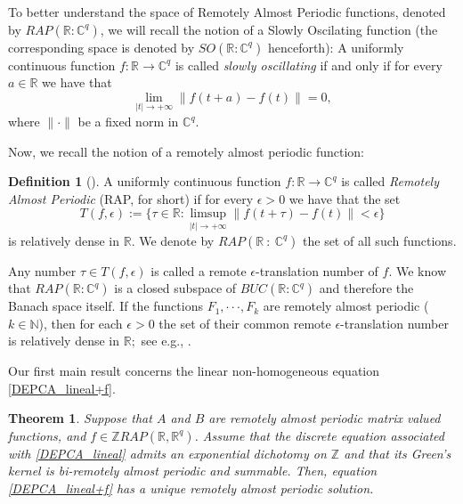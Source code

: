 \documentclass[english,,reqno]{amsart}
\numberwithin{equation}{section}
\theoremstyle{plain}
\newtheorem{thm}{Theorem}[section]
\theoremstyle{definition}
\newtheorem{defn}{Definition}[section]
\theoremstyle{remark}
\begin{document}
To better understand the space of Remotely Almost Periodic functions, denoted by $RAP({\mathbb R } : {\mathbb C }^{q})$, we will recall the notion of a Slowly Oscilating function (the corresponding space is denoted by $SO({\mathbb R } : {\mathbb C }^{q})$ henceforth):
A uniformly continuous function $f:\mathbb{R}\rightarrow \mathbb{C}^q$ is called {\it slowly oscillating} if and only if for every $a\in {\mathbb R}$ we have that
\[
\lim_{|t|\rightarrow +\infty}\| f(t+a)-f(t)\|=0,
\]
where $\|\cdot  \|$ be a fixed norm in $\mathbb C^q$.

Now, we recall the notion of a remotely almost periodic function:


\begin{defn}[\cite{pinto_remotely, zhang_depca}]\label{rap}
A uniformly continuous function $f:\mathbb{R}\rightarrow \mathbb{C}^q$ is called \textit{Remotely Almost Periodic} (RAP, for short) if for every $\epsilon>0$ we have that the set
$$
T(f,\epsilon):=\Biggl\{ \tau \in {\mathbb R}: \limsup_{|t|\rightarrow +\infty}\| f(t+\tau)-f(t)\|<\epsilon\Biggr\}
$$
is relatively dense in $ {\mathbb R}.$  We denote by $RAP (\mathbb R\ : \ \mathbb C^q)$ the set of all such functions.
\end{defn}

Any number $\tau \in T(f,\epsilon)$ is called a remote $\epsilon$-translation number of $f$. We know that $RAP({\mathbb R } : {\mathbb C }^{q})$ is a closed subspace of 
$BUC({\mathbb R } : {\mathbb C }^{q})$ and therefore the Banach space itself. 		
If the functions $F_{1}, \cdot \cdot \cdot, F_{k}$ are remotely almost periodic ($k\in {\mathbb N}$), then for each $\epsilon>0$ the set of their common
remote $\epsilon$-translation number is relatively dense in ${\mathbb R};$ see e.g., \cite[Proposition 2.3]{zhang_parabolic}.

Our first main result concerns the linear non-homogeneous equation \eqref{DEPCA_lineal+f}.


\begin{thm}\label{existencia_solucion_depca_rap}
Suppose that $A$ and $B$ are remotely almost periodic matrix valued functions, and $f \in \mathbb{Z}RAP(\mathbb{R}, \mathbb{R}^q)$.  
Assume that the discrete equation associated with \eqref{DEPCA_lineal} admits an exponential dichotomy on $\mathbb{Z}$ and that its Green's kernel is bi-remotely almost periodic and summable.  
Then, equation \eqref{DEPCA_lineal+f} has a unique remotely almost periodic solution.
\end{thm}
\end{document}
